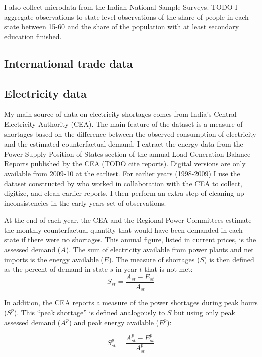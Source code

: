 \documentclass[11pt]{article}
\begin{document}
I also collect microdata from the Indian National Sample Surveys. TODO I aggregate observations to state-level observations of the share of people in each state between 15-60 and the share of the population with at least secondary education finished.

\subsection{International trade data}%
\label{sub:international_trade_data}



\subsection{Electricity data}%
\label{sub:energy_data}

My main source of data on electricity shortages comes from India's Central Electricity Authority (CEA). The main feature of the dataset is a measure of shortages based on the difference between the observed consumption of electricity and the estimated counterfactual demand. I extract the energy data from the Power Supply Position of States section of the annual Load Generation Balance Reports published by the CEA (TODO cite reports). Digital versions are only available from 2009-10 at the earliest. For earlier years (1998-2009) I use the dataset constructed by \cite{allcott_how_2016} who worked in collaboration with the CEA to collect, digitize, and clean earlier reports. I then perform an extra step of cleaning up inconsistencies in the early-years set of observations.

At the end of each year, the CEA and the Regional Power Committees estimate the monthly counterfactual quantity that would have been demanded in each state if there were no shortages. This annual figure, listed in current prices, is the assessed demand (\(A\)). The sum of electricity available from power plants and net imports is the energy available ($E$). The measure of shortages (\(S\)) is then defined as the percent of demand in state \(s\) in year \(t\) that is not met:
\[
S_{st} = \frac{A_{st} - E_{st} }{A_{st}}
\]

In addition, the CEA reports a measure of the power shortages during peak hours (\(S^p\)). This ``peak shortage'' is defined analogously to \(S\) but using only peak assessed demand (\(A^{p}\)) and peak energy available (\(E^p\)):

\[
S^{p}_{st} = \frac{A^{p}_{st} - E^{p}_{st}}{A^{p}_{st}}
\]
\end{document}
